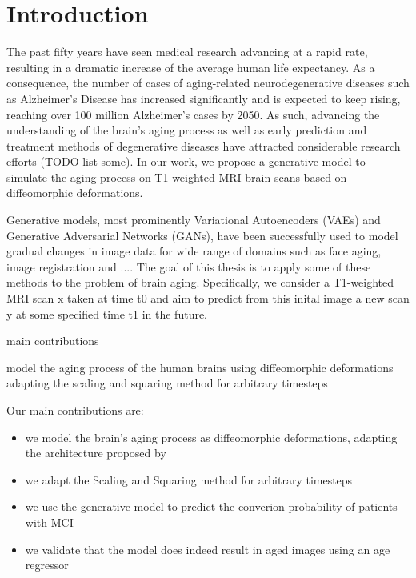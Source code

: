 \chapter{Introduction}




The past fifty years have seen medical research advancing at a rapid rate, resulting in a dramatic increase of the average human life expectancy. As a consequence, the number of cases of aging-related neurodegenerative diseases such as Alzheimer's Disease has increased significantly and is expected to keep rising, reaching over 100 million Alzheimer's cases by 2050. As such, advancing the understanding of the brain's aging process as well as early prediction and treatment methods of degenerative diseases have attracted considerable research efforts (TODO list some). In our work, we propose a generative model to simulate the aging process on T1-weighted MRI brain scans based on diffeomorphic deformations.

 

Generative models, most prominently Variational Autoencoders (VAEs) and Generative Adversarial Networks (GANs), have been successfully used to model gradual changes in image data for wide range of domains such as face aging, image registration and .... The goal of this thesis is to apply some of these methods to the problem of brain aging. Specifically, we consider a T1-weighted MRI scan x taken at time t0 and aim to predict from this inital image a new scan y at some specified time t1 in the future. 





main contributions

model the aging process of the human brains using diffeomorphic deformations
adapting the scaling and squaring method for arbitrary timesteps

Our main contributions are:

\begin{itemize}
	\item we model the brain's aging process as diffeomorphic deformations, adapting the architecture proposed by \cite{voxelmorph}
	\item we adapt the Scaling and Squaring method for arbitrary timesteps

	\item we use the generative model to predict the converion probability of patients with MCI

	\item we validate that the model does indeed result in aged images using an age regressor


\end{itemize}
